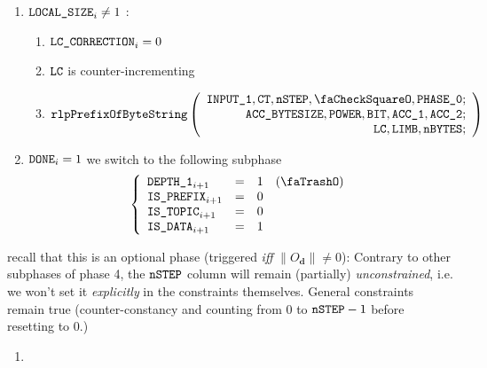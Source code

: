 \begin{description}
\begin{enumerate}[resume]
\begin{enumerate}
\begin{enumerate}
\begin{enumerate}
\begin{itemize}
										\end{itemize}
								\end{enumerate}
							\item \If $\texttt{LOCAL\_SIZE}_{i} \neq 1$ \Then:
								\begin{enumerate}
									\item $\texttt{LC\_CORRECTION}_{i}=0$
									\item $\texttt{LC}$ is counter-incrementing
									\item 
										\[
											\rlpPrefixByteString
											\left( \begin{array}{r}
												\Input1,
												\ct,
												\nbstep,
												\done,
												\phase{0}; \\
												\accsize,
												\Power,
												\col{BIT},
												\acc1,
												\acc2; \\
												\lc,
												\limb,
												\limbsize; \\
											\end{array} \right)
										\]
								\end{enumerate}
							\item \If $\texttt{DONE}_{i}=1$ \Then we switch to the following subphase
								\[
									\left\{ \begin{array}{lclr}
										\Depth 1_{i + 1}   & = & 1 & (\trash) \\
										\isPrefix_{i + 1}  & = & 0 &          \\
										\isOt_{i + 1}      & = & 0 &          \\
										\isOd_{i + 1}      & = & 1 &          \\
									\end{array} \right.
								\]
						\end{enumerate}
					\end{enumerate}
				\end{enumerate}
			\item[\underline{Listing the data limbs of $O_{\mathbf{d}}$:}] recall that this is an optional phase (triggered \emph{iff} $\|O_\textbf{d}\|\neq0$):
				\saNote{} Contrary to other subphases of phase 4, the $\texttt{nSTEP}$ column will remain (partially) \emph{unconstrained}, i.e. we won't set it \emph{explicitly} in the constraints themselves. General constraints remain true (counter-constancy and \ct{} counting from $0$ to $\texttt{nSTEP} - 1$ before resetting to $0$.)
				\begin{enumerate}[resume]    
					\item \If %

\end{enumerate}
\end{description}
